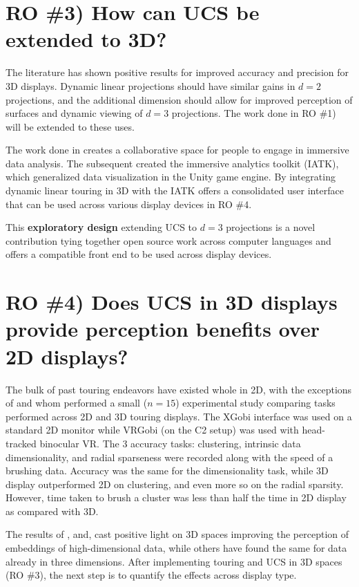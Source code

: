 \documentclass{monashthesis}
\begin{document}
\section{RO \#3) How can UCS be extended to
3D?}\label{ro-3-how-can-ucs-be-extended-to-3d}

The literature has shown positive results for improved accuracy and
precision for 3D displays. Dynamic linear projections should have
similar gains in \(d=2\) projections, and the additional dimension
should allow for improved perception of surfaces and dynamic viewing of
\(d=3\) projections. The work done in RO \#1) will be extended to these
uses.

The work done in \textcite{cordeil_imaxes:_2017} creates a collaborative
space for people to engage in immersive data analysis. The subsequent
\textcite{cordeil_immersive_2019} created the immersive analytics
toolkit (IATK), which generalized data visualization in the Unity game
engine. By integrating dynamic linear touring in 3D with the IATK offers
a consolidated user interface that can be used across various display
devices in RO \#4.

This \textbf{exploratory design} extending UCS to \(d=3\) projections is
a novel contribution tying together open source work across computer
languages and offers a compatible front end to be used across display
devices.

\section{RO \#4) Does UCS in 3D displays provide perception benefits
over 2D displays?}\label{UCS_3dvs2d}

The bulk of past touring endeavors have existed whole in 2D, with the
exceptions of \textcite{nelson_xgobi_1998} and
\textcite{arms_benefits_1999} whom performed a small (\(n=15\))
experimental study comparing tasks performed across 2D and 3D touring
displays. The XGobi interface was used on a standard 2D monitor while
VRGobi (on the C2 setup) was used with head-tracked binocular VR. The 3
accuracy tasks: clustering, intrinsic data dimensionality, and radial
sparseness were recorded along with the speed of a brushing data.
Accuracy was the same for the dimensionality task, while 3D display
outperformed 2D on clustering, and even more so on the radial sparsity.
However, time taken to brush a cluster was less than half the time in 2D
display as compared with 3D.

The results of \textcite{wagner_filho_immersive_2018},
\textcite{nelson_xgobi_1998} and, \textcite{arms_benefits_1999} cast
positive light on 3D spaces improving the perception of embeddings of
high-dimensional data, while others have found the same for data already
in three dimensions. After implementing touring and UCS in 3D spaces (RO
\#3), the next step is to quantify the effects across display type.
\end{document}
